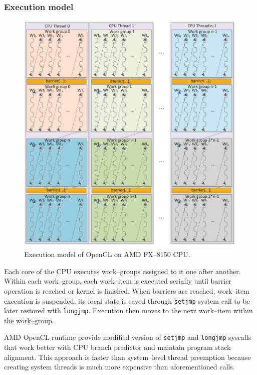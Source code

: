 \subsubsection{Execution model}
\begin{figure}[htb]
  \begin{center}
    \includegraphics[width=\textwidth]{chapters/opencl/bulldozerexec.png}
  \end{center}
  \caption{Execution model of OpenCL on AMD FX--8150 CPU.}
  \label{fig:clbullexec}
\end{figure}

Each core of the CPU executes work--groups assigned to it one after another.
Within each work--group, each work--item is executed serially until barrier
operation is reached or kernel is finished. When barriers are reached,
work--item execution is suspended, its local state is saved through
\texttt{setjmp} system call to be later restored with \texttt{longjmp}.
Execution then moves to the next work--item within the work--group.

AMD OpenCL
runtime provide modified version of \texttt{setjmp} and \texttt{longjmp} syscalls
that work better with CPU branch predictor and maintain program stack alignment.
This approach is faster than system--level thread preemption because creating
system threads is much more expensive than aforementioned calls.

